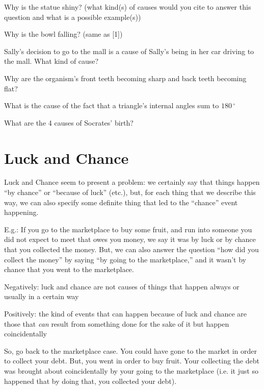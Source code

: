 \documentclass[oneside]{article}
\begin{document}
\noindent [1] Why is the statue shiny? (what kind(s) of causes would you cite to answer this question and what is a possible example(s))
\vspace*{3mm}

\noindent [2] Why is the bowl falling? (same as [1])
\vspace*{3mm}

\noindent [3] Sally's decision to go to the mall is a cause of Sally's being in her car driving to the mall. What kind of cause? 
\vspace*{3mm}

\noindent [4] Why are the organism's front teeth becoming sharp and back teeth becoming flat? 
\vspace*{3mm}

\noindent [5] What is the  cause of the fact that a triangle's internal angles sum to $180\,^{\circ}$
\vspace*{3mm}

\noindent [6] What are the 4 causes of Socrates' birth?

\section*{Luck and Chance}

\noindent Luck and Chance seem to present a problem: we certainly say that things happen ``by chance'' or ``because of luck'' (etc.), but, for each thing that we describe this way, we can also specify some definite thing that led to the ``chance'' event happening.
\vspace*{2mm}

E.g.: If you go to the marketplace to buy some fruit, and run into someone you did not expect to meet that owes you money, we say it was by luck or by chance that you collected the money. But, we can also answer the question ``how did you collect the money'' by saying ``by going to the marketplace,'' and it wasn't by chance that you went to the marketplace.
\vspace{2mm}

\noindent Negatively: luck and chance are not causes of things that happen always or usually in a certain way
\vspace*{2mm}

\noindent Positively: the kind of events that can happen because of luck and chance are those that \emph{can}  result from something done for the sake of it but happen coincidentally
\vspace*{2mm}

So, go back to the marketplace case. You could have gone to the market in order to collect your debt. But,  you went in order to buy fruit. Your collecting the debt was brought about coincidentally by your going to the marketplace (i.e. it just so happened that by doing that, you collected your debt).

\end{document}
